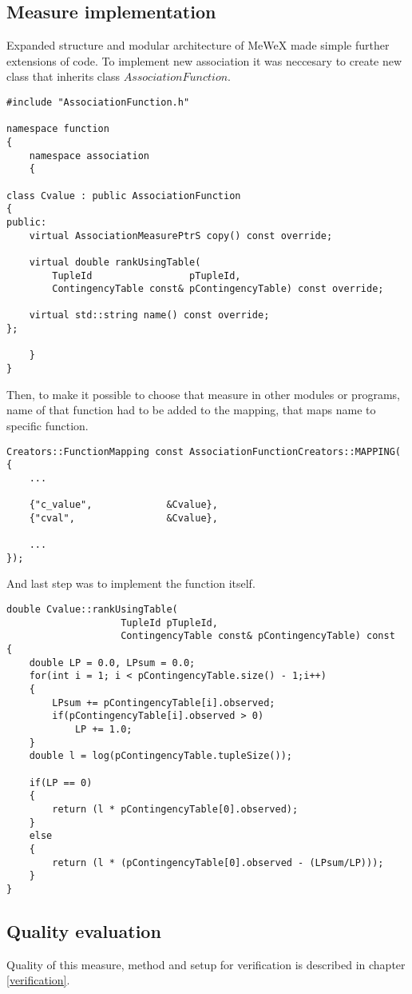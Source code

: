 \subsection{Measure implementation}
Expanded structure and modular architecture of MeWeX made simple further extensions of code. To implement new association 
it was neccesary to create new class that inherits class \(AssociationFunction\).
\begin{lstlisting}
#include "AssociationFunction.h"

namespace function
{
    namespace association
    {

class Cvalue : public AssociationFunction
{
public:
    virtual AssociationMeasurePtrS copy() const override;

    virtual double rankUsingTable(
        TupleId 				pTupleId,
        ContingencyTable const& pContingencyTable) const override;

    virtual std::string	name() const override;
};

    }
}
\end{lstlisting}
Then, to make it possible to choose that measure in other modules or programs, name of that function had to be added to the mapping,
that maps name to specific function.
\begin{lstlisting}
Creators::FunctionMapping const AssociationFunctionCreators::MAPPING(
{
    ...

    {"c_value",				&Cvalue},
    {"cval",				&Cvalue},

    ...
});
\end{lstlisting}
And last step was to implement the function itself.
\begin{lstlisting}
double Cvalue::rankUsingTable(
                    TupleId pTupleId, 
                    ContingencyTable const& pContingencyTable) const
{
    double LP = 0.0, LPsum = 0.0;
    for(int i = 1; i < pContingencyTable.size() - 1;i++)
    {
        LPsum += pContingencyTable[i].observed;
        if(pContingencyTable[i].observed > 0)
            LP += 1.0;
    }
    double l = log(pContingencyTable.tupleSize());

    if(LP == 0)
    {
        return (l * pContingencyTable[0].observed);
    }
    else
    {
        return (l * (pContingencyTable[0].observed - (LPsum/LP)));
    }
}
\end{lstlisting}

\subsection{Quality evaluation}
Quality of this measure, method and setup for verification is described in chapter \ref{verification}.